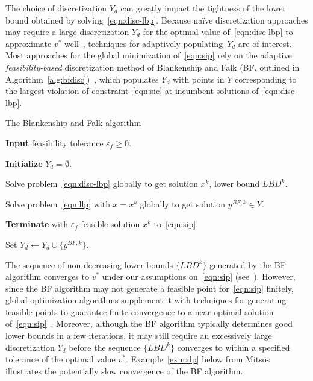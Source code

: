 \documentclass{article}
\newcommand{\1}[1]{\mathds{1}\left[#1\right]}
\begin{document}
The choice of discretization $Y_d$ can greatly impact the tightness of the lower bound obtained by solving~\eqref{eqn:disc-lbp}.
Because na\"ive discretization approaches may require a large discretization $Y_d$ for the optimal value of~\eqref{eqn:disc-lbp} to approximate $v^*$ well~\cite{still2001discretization}, techniques for adaptively populating~$Y_d$ are of interest.
Most approaches for the global minimization of~\eqref{eqn:sip} rely on the adaptive \textit{feasibility-based} discretization method of Blankenship and Falk (BF, outlined in Algorithm~\ref{alg:bfdisc})~\cite{blankenship1976infinitely}, which populates $Y_d$ with points in $Y$ corresponding to the largest violation of constraint~\eqref{eqn:sic} at incumbent solutions of~\eqref{eqn:disc-lbp}.



\begin{algorithm}[t]
\caption{The Blankenship and Falk algorithm \cite{blankenship1976infinitely}}
\label{alg:bfdisc}
{
\begin{algorithmic}[1]
\State \textbf{Input} feasibility tolerance $\varepsilon_f \geq 0$.

\State \textbf{Initialize} $Y_d = \emptyset$.


\State Solve problem~\eqref{eqn:disc-lbp} globally to get solution $x^k$, lower bound $LBD^k$.

\State Solve problem~\eqref{eqn:llp} with $x = x^k$ globally to get solution $y^{BF,k} \in Y$.


\State \textbf{Terminate} with $\varepsilon_f$-feasible solution $x^k$ to~\eqref{eqn:sip}.

\Else

\State Set $Y_d \leftarrow Y_d \cup \{ y^{BF,k} \}$.

\EndIf

\EndFor

\end{algorithmic}
}
\end{algorithm}




The sequence of non-decreasing lower bounds $\{LBD^k\}$ generated by the BF algorithm converges to $v^*$ under our assumptions on~\eqref{eqn:sip} (see~\citep[Theorem~2.1]{blankenship1976infinitely}).
However, since the BF algorithm may not generate a feasible point for~\eqref{eqn:sip} finitely, global optimization algorithms supplement it with techniques for generating feasible points to guarantee finite convergence to a near-optimal solution of~\eqref{eqn:sip}~\cite{mitsos2011global}.
Moreover, although the BF algorithm typically determines good lower bounds in a few iterations, it may still require an excessively large discretization $Y_d$ before the sequence $\{LBD^k\}$ converges to within a specified tolerance of the optimal value $v^*$.
Example~\ref{exm:dp} below from Mitsos~\cite{mitsos2009test} illustrates the potentially slow convergence of the BF algorithm.
\end{document}
